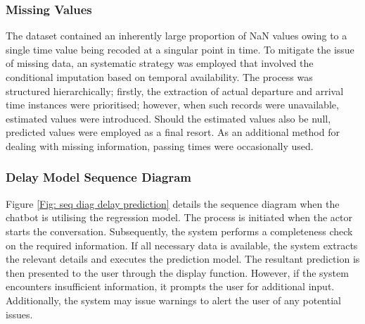 \subsubsection{Missing Values}\label{sec: missing values} The dataset contained an inherently large proportion of NaN values owing to a single time value being recoded at a singular point in time. To mitigate the issue of missing data, an systematic strategy was employed that involved the conditional imputation based on temporal availability. The process was structured hierarchically; firstly, the extraction of actual departure and arrival time instances were prioritised; however, when such records were unavailable, estimated values were introduced. Should the estimated values also be null, predicted values were employed as a final resort. As an additional method for dealing with missing information, passing times were occasionally used.

\subsubsection{Delay Model Sequence Diagram}
Figure \ref{Fig: seq diag delay prediction} details the sequence diagram when the chatbot is utilising the regression model. The process is initiated when the actor starts the conversation. Subsequently, the system performs a completeness check on the required information. If all necessary data is available, the system extracts the relevant details and executes the prediction model. The resultant prediction is then presented to the user through the display function. However, if the system encounters insufficient information, it prompts the user for additional input. Additionally, the system may issue warnings to alert the user of any potential issues.